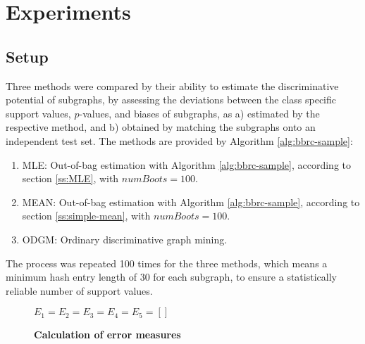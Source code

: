 \documentclass{sig-alternate}
\begin{document}
\section{Experiments}
\label{s:Experiments}

\subsection{Setup} 
\label{ss:Error-estimation} 
Three methods were compared by their ability to estimate the discriminative
potential of subgraphs, by assessing the deviations between the class specific
support values, $p$-values, and biases of subgraphs, as a) estimated by the respective
method, and b) obtained by matching the subgraphs onto an independent test set.
The methods are provided by Algorithm \ref{alg:bbrc-sample}:
\begin{enumerate} 
  \item MLE: Out-of-bag estimation with Algorithm \ref{alg:bbrc-sample}, according
    to section \ref{ss:MLE}, with $numBoots=100$.
  \item MEAN: Out-of-bag estimation with Algorithm \ref{alg:bbrc-sample}, according
    to section \ref{ss:simple-mean}, with $numBoots=100$.
  \item ODGM: Ordinary discriminative graph mining.
\end{enumerate}

The process was repeated 100 times for the three methods, which means a minimum hash entry length 
of 30 for each subgraph, to ensure a statistically reliable number of support values. 

\begin{figure*}[t]
  \begin{minipage}[h]{.59\textwidth}
    \begin{algorithm2e}[H]
      \fontsize{8}{10}
      \selectfont
      $E_1 =  E_2 =  E_3 =  E_4 =  E_5 =  \left[ \right]$\;
      \caption{\textbf{Calculation of error measures}\label{alg:pValEstimate}}
    \end{algorithm2e}
  \end{minipage}
  \begin{minipage}[h]{.39\textwidth}
    
  \end{minipage}
\end{figure*}
\end{document}
